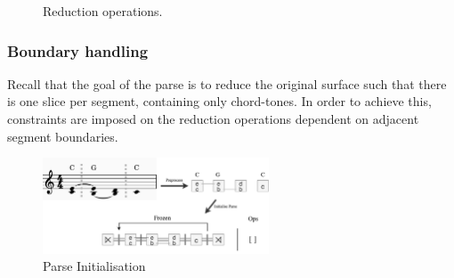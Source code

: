 \documentclass[12pt,a4paper,twoside,openany]{report} \usepackage[pdfborder={0 0 0}]{hyperref}    %
\theoremstyle{definition} \newtheorem{definition}{Definition}[section]
\begin{document}
\begin{figure}[h]
  \captionsetup{width=.9\linewidth} \caption{Reduction operations.} \label{fig:evalOps} \end{figure}

%
%
%
%
%
%

  \subsubsection{Boundary handling}
  \label{sub:boundaryHandling}

  Recall that the goal of the parse is to reduce the original surface such that there is one slice per segment,
  containing only chord-tones. In order to achieve this, constraints are imposed on the reduction operations dependent
  on adjacent segment boundaries. 

  \begin{figure}[h] \centering \includegraphics[width=0.6\textwidth]{impl/parseInit.png} \caption{Parse Initialisation}
  \label{fig:parseInit} \end{figure}
\end{document}
